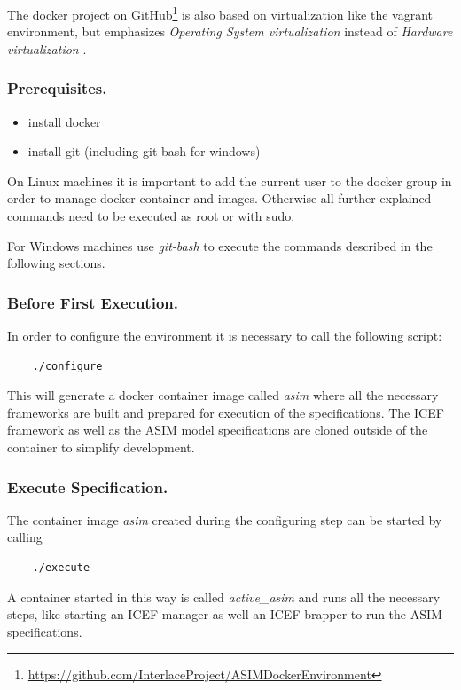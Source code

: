 The docker project on GitHub\footnote{\url{https://github.com/InterlaceProject/ASIMDockerEnvironment}} is also based on virtualization like the vagrant environment, but emphasizes \textit{Operating System virtualization} instead of \textit{Hardware virtualization} \cite{VirtualMachines2005}.

\subsubsection{Prerequisites.\ \ }
\begin{itemize}
	\item install docker
	\item install git (including git bash for windows)
\end{itemize}
On Linux machines it is important to add the current user to the docker group in order to manage docker container and images. Otherwise all further explained commands need to be executed as root or with sudo.

For Windows machines use \textit{git-bash} to execute the commands described in the following sections.

\subsubsection{Before First Execution.\ \ }

In order to configure the environment it is necessary to call the following script:
\begin{lstlisting}
	./configure
\end{lstlisting}
This will generate a docker container image called \textit{asim} where all the necessary frameworks are built and prepared for execution of the specifications. The ICEF framework as well as the ASIM model specifications are cloned outside of the container to simplify development.

\subsubsection{Execute Specification.\ \ }
The container image \textit{asim} created during the configuring step can be started by calling
\begin{lstlisting}
	./execute
\end{lstlisting}
A container started in this way is called \textit{active\_asim} and runs all the necessary steps, like starting an ICEF manager as well an ICEF brapper to run the ASIM specifications.

